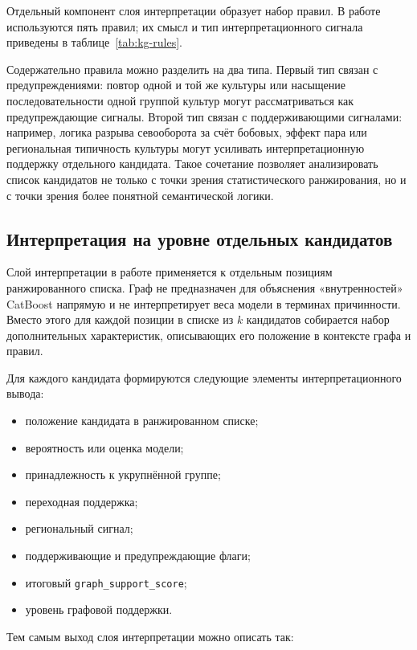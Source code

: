 Отдельный компонент слоя интерпретации образует набор правил. В работе используются
пять правил; их смысл и тип интерпретационного сигнала приведены в
таблице~\ref{tab:kg-rules}.



Содержательно правила можно разделить на два типа. Первый тип связан с
предупреждениями: повтор одной и той же культуры или насыщение последовательности
одной группой культур могут рассматриваться как предупреждающие сигналы. Второй тип
связан с поддерживающими сигналами: например, логика разрыва севооборота за счёт
бобовых, эффект пара или региональная типичность культуры могут усиливать
интерпретационную поддержку отдельного кандидата. Такое сочетание позволяет
анализировать список кандидатов не только с точки зрения статистического ранжирования,
но и с точки зрения более понятной семантической логики.

\subsection{Интерпретация на уровне отдельных кандидатов}

Слой интерпретации в работе применяется к отдельным позициям ранжированного списка.
Граф не предназначен для объяснения «внутренностей» CatBoost
напрямую и не интерпретирует веса модели в терминах причинности. Вместо этого для
каждой позиции в списке из \(k\) кандидатов собирается набор дополнительных
характеристик, описывающих его положение в контексте графа и правил.

Для каждого кандидата формируются следующие элементы интерпретационного вывода:

\begin{itemize}
\tightlist
\item
  положение кандидата в ранжированном списке;
\item
  вероятность или оценка модели;
\item
  принадлежность к укрупнённой группе;
\item
  переходная поддержка;
\item
  региональный сигнал;
\item
  поддерживающие и предупреждающие флаги;
\item
  итоговый \texttt{graph\_support\_score};
\item
  уровень графовой поддержки.
\end{itemize}

Тем самым выход слоя интерпретации можно описать так:

